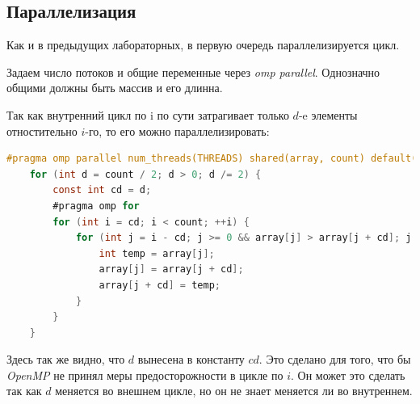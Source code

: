 \subsection{Параллелизация}

Как и в предыдущих лабораторных, в первую очередь параллелизируется цикл.

Задаем число потоков и общие переменные через \textit{omp parallel}.
Однозначно общими должны быть массив и его длинна.

Так как внутренний цикл по i по сути затрагивает только $d$-e элементы отностительно $i$-го, то его можно параллелизировать:

\begin{lstlisting}[language=C, basicstyle=\scriptsize]
 #pragma omp parallel num_threads(THREADS) shared(array, count) default(none)
    for (int d = count / 2; d > 0; d /= 2) {
        const int cd = d;
        #pragma omp for
        for (int i = cd; i < count; ++i) {
            for (int j = i - cd; j >= 0 && array[j] > array[j + cd]; j -= cd) {
                int temp = array[j];
                array[j] = array[j + cd];
                array[j + cd] = temp;
            }
        }
    }
\end{lstlisting}

Здесь так же видно, что $d$ вынесена в константу $cd$.
Это сделано для того, что бы \textit{OpenMP} не принял меры предосторожности в цикле по $i$.
Он может это сделать так как $d$ меняется во внешнем цикле, но он не знает меняется ли во внутреннем.
